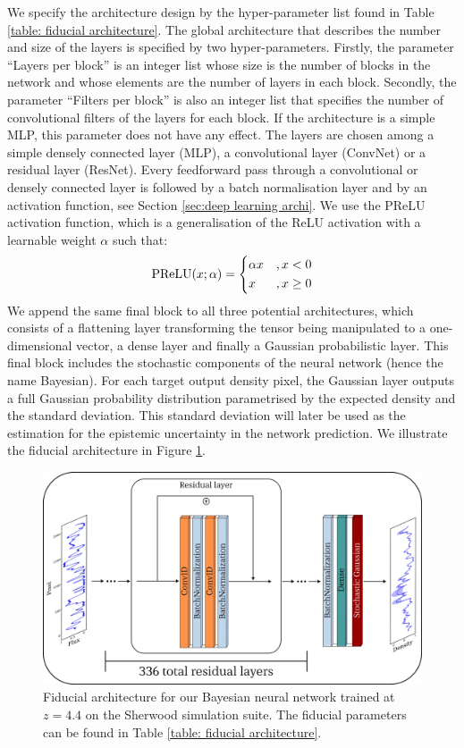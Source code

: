 We specify the architecture design by the hyper-parameter list found in Table \ref{table: fiducial architecture}. The global architecture that describes the number and size of the layers is specified by two hyper-parameters. Firstly, the parameter ``Layers per block'' is an integer list whose size is the number of blocks in the network and whose elements are the number of layers in each block. Secondly, the parameter ``Filters per block'' is also an integer list that specifies the number of convolutional filters of the layers for each block. If the architecture is a simple MLP, this parameter does not have any effect. The layers are chosen among a simple densely connected layer (MLP), a convolutional layer (ConvNet) or a residual layer (ResNet). Every feedforward pass through a convolutional or densely connected layer is followed by a batch normalisation layer and by an activation function, see Section \ref{sec:deep learning archi}. We use the PReLU activation function, which is a generalisation of the ReLU activation with a learnable weight $\alpha$ such that:
\begin{equation}
    \text{PReLU}(x;\alpha)=
    \begin{dcases}
        \alpha x &  , x<0\\
        x & , x\geq 0
    \end{dcases}
\end{equation}
We append the same final block to all three potential architectures, which consists of a flattening layer transforming the tensor being manipulated to a one-dimensional vector, a dense layer and finally a Gaussian probabilistic layer.
This final block includes the stochastic components of the neural network (hence the name Bayesian). For each target output density pixel, the Gaussian layer outputs a full Gaussian probability distribution parametrised by the expected density and the standard deviation. This standard deviation will later be used as the estimation for the epistemic uncertainty in the network prediction. We illustrate the fiducial architecture in Figure \ref{fig:ML nn architecture}.
\begin{figure}
    \centering
    \includegraphics[width=1\linewidth]{img/ML/nn_archi.jpg}
    \caption{Fiducial architecture for our Bayesian neural network trained at $z=4.4$ on the Sherwood simulation suite. The fiducial parameters can be found in Table \ref{table: fiducial architecture}.}
    \label{fig:ML nn architecture}
\end{figure}

